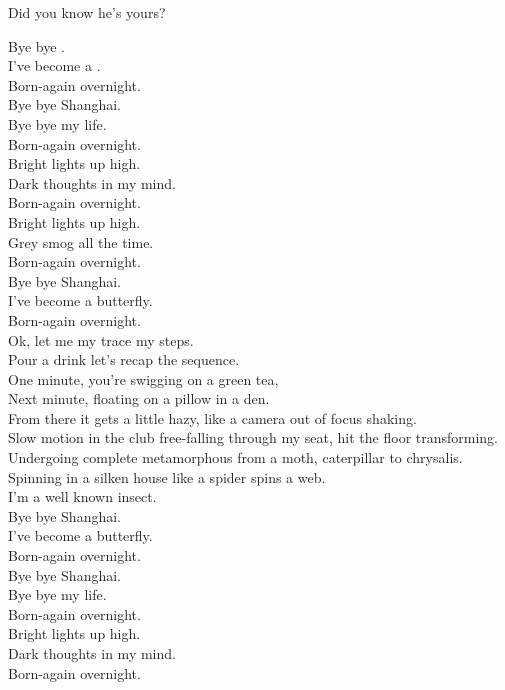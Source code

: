 Did you know he's yours? \\




Bye bye . \\
I've become a . \\
Born-again overnight. \\
Bye bye Shanghai. \\
Bye bye my life. \\
Born-again overnight. \\
Bright lights up high. \\
Dark thoughts in my mind. \\
Born-again overnight. \\
Bright lights up high. \\
Grey smog all the time. \\
Born-again overnight. \\
Bye bye Shanghai. \\
I've become a butterfly. \\
Born-again overnight. \\

Ok, let me my trace my steps. \\
Pour a drink let's recap the sequence. \\
One minute, you're swigging on a green tea, \\
Next minute, floating on a pillow in a den. \\
From there it gets a little hazy, like a camera out of focus shaking. \\
Slow motion in the club free-falling through my seat, hit the floor transforming. \\
Undergoing complete metamorphous from a moth, caterpillar to chrysalis. \\
Spinning in a silken house like a spider spins a web. \\
I'm a well known insect. \\

Bye bye Shanghai. \\
I've become a butterfly. \\
Born-again overnight. \\
Bye bye Shanghai. \\
Bye bye my life. \\
Born-again overnight. \\
Bright lights up high. \\
Dark thoughts in my mind. \\
Born-again overnight. \\

